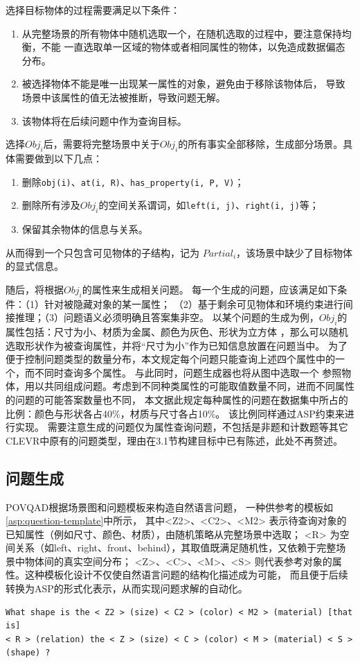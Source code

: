 选择目标物体的过程需要满足以下条件：
\begin{enumerate}[nosep]
\item 从完整场景的所有物体中随机选取一个，在随机选取的过程中，要注意保持均衡，不能
一直选取单一区域的物体或者相同属性的物体，以免造成数据偏态分布。
\item 被选择物体不能是唯一出现某一属性的对象，避免由于移除该物体后，
导致场景中该属性的值无法被推断，导致问题无解。
\item 该物体将在后续问题中作为查询目标。
\end{enumerate}

选择$Obj_i$后，需要将完整场景中关于$Obj_i$的所有事实全部移除，生成部分场景。具体需要做到以下几点：
\begin{enumerate}[nosep]
\item 删除\texttt{obj(i)}、\texttt{at(i, R)}、\texttt{has\_property(i, P, V)}；
\item 删除所有涉及$Obj_i$的空间关系谓词，如\texttt{left(i, j)}、\texttt{right(i, j)}等；
\item 保留其余物体的信息与关系。
\end{enumerate}
从而得到一个只包含可见物体的子结构，记为 $Partial_i$，该场景中缺少了目标物体的显式信息。

随后，将根据$Obj_i$的属性来生成相关问题。
每一个生成的问题，应该满足如下条件：（1）针对被隐藏对象的某一属性；
（2）基于剩余可见物体和环境约束进行间接推理；（3）问题语义必须明确且答案集非空。
以某个问题的生成为例，$Obj_i$的属性包括：尺寸为小、材质为金属、颜色为灰色、形状为立方体
，那么可以随机选取形状作为被查询属性，并将“尺寸为小”作为已知信息放置在问题当中。
为了便于控制问题类型的数量分布，本文规定每个问题只能查询上述四个属性中的一个，而不同时查询多个属性。
与此同时，问题生成器也将从图中选取一个
参照物体，用以共同组成问题。考虑到不同种类属性的可能取值数量不同，进而不同属性的问题的可能答案数量也不同，
本文据此规定每种属性的问题在数据集中所占的比例：颜色与形状各占40\%，材质与尺寸各占10\%。
该比例同样通过ASP约束来进行实现。
需要注意生成的问题仅为属性查询问题，不包括是非题和计数题等其它CLEVR中原有的问题类型，理由在3.1节构建目标中已有陈述，此处不再赘述。

\subsection{问题生成}
POVQAD根据场景图和问题模板来构造自然语言问题，
一种供参考的模板如\ref{asp:question-template}中所示，
其中<Z2>、<C2>、<M2> 表示待查询对象的已知属性（例如尺寸、颜色、材质），由随机策略从完整场景中选取；
<R> 为空间关系（如left、right、front、behind），其取值既满足随机性，又依赖于完整场景中物体间的真实空间分布；
<Z>、<C>、<M>、<S> 则代表参考对象的属性。这种模板化设计不仅使自然语言问题的结构化描述成为可能，
而且便于后续转换为ASP的形式化表示，从而实现问题求解的自动化。
\begin{lstlisting}[label=asp:question-template]
What shape is the < Z2 > (size) < C2 > (color) < M2 > (material) [that is] 
< R > (relation) the < Z > (size) < C > (color) < M > (material) < S > (shape) ?
\end{lstlisting}


